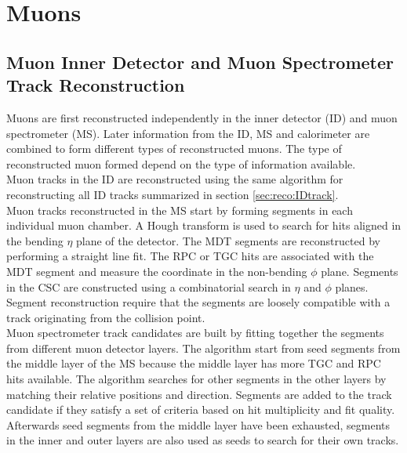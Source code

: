 \section{Muons}
\label{sec:reco:muon}

\subsection{Muon Inner Detector and Muon Spectrometer Track Reconstruction}
\label{sec:reco:IDMStrk}

\indent Muons are first reconstructed independently in the inner detector (ID) and muon spectrometer (MS). Later information from the ID, MS and calorimeter are combined to form different types of reconstructed muons.  The type of reconstructed muon formed depend on the type of information available.\cite{MuonReco} \\

\indent Muon tracks in the ID are reconstructed using the same algorithm for reconstructing all ID tracks summarized in section \ref{sec:reco:IDtrack}. \\

\indent Muon tracks reconstructed in the MS start by forming segments in each individual muon chamber.  A Hough transform is used to search for hits aligned in the bending $\eta$ plane of the detector.\cite{HoughTrans}  The MDT segments are reconstructed by performing a straight line fit.  The RPC or TGC hits are associated with the MDT segment and measure the coordinate in the non-bending $\phi$ plane.  Segments in the CSC are constructed using a combinatorial search in $\eta$ and $\phi$ planes.  Segment reconstruction require that the segments are loosely compatible with a track originating from the collision point.  \\

\indent Muon spectrometer track candidates are built by fitting together the segments from different muon detector layers.  The algorithm start from seed segments from the middle layer of the MS because the middle layer has more TGC and RPC hits available.  The algorithm searches for other segments in the other layers by matching their relative positions and direction.  Segments are added to the track candidate if they satisfy a set of criteria based on hit multiplicity and fit quality.   Afterwards seed segments from the middle layer have been exhausted, segments in the inner and outer layers are also used as seeds to search for their own tracks.  \\


